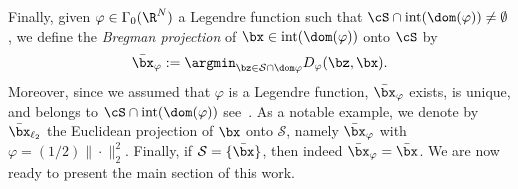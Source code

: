 \documentclass[11pt]{amsart}
\newcommand{\es}[1]{{\color{blue}#1}}
\newcommand{\jc}[1]{{\color{red}#1}}
\begin{document}
Finally, given $\varphi\in\Gamma_0(\R^N)$ a Legendre function such that $\cS \cap \mathrm{int}(\dom(\varphi)) \neq \emptyset$, we define the \emph{Bregman projection} of $\bx\in \mathrm{int}(\dom(\varphi))$  onto $\cS$ by
\begin{equation}\label{eq:bregproj}
    \bar\bx_\varphi := \argmin_{\bz \in \mathcal{S} \cap \dom \varphi} D_\varphi(\bz,\bx).
\end{equation}
Moreover, since we assumed that $\varphi$ is a Legendre function, $\bar\bx_\varphi$ exists, is unique, and belongs to $\cS \cap \mathrm{int}(\dom(\varphi))$ see~\cite[Theorem 3.12]{Bauschke1997}. As a notable example, we denote by $\bar\bx_{\ell_2}$ the Euclidean projection of $\bx$ onto $\mathcal{S}$, namely $\bar\bx_\varphi$ with $\varphi=(1/2)\|\cdot\|^2_2$. Finally, if $\mathcal{S}=\{\bar\bx\}$, then indeed $\bar\bx_\varphi=\bar\bx$. We are now ready to present the main section of this work.


\end{document}
